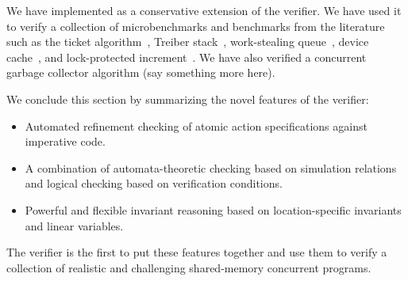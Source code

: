 We have implemented \civl as a conservative extension of the \boogie verifier.  
We have used it to verify a collection of microbenchmarks and benchmarks from the literature such as
the ticket algorithm~\cite{ticket}, Treiber stack~\cite{treiber}, work-stealing queue~\cite{wsq},
device cache~\cite{device-cache}, and lock-protected increment~\cite{incr}.
We have also verified a concurrent garbage collector algorithm (say something more here).

We conclude this section by summarizing the novel features of the \civl verifier:
\begin{itemize}
\item Automated refinement checking of atomic action specifications against imperative code.
\item A combination of automata-theoretic checking based on simulation relations and logical checking based on verification conditions.
\item Powerful and flexible invariant reasoning based on location-specific invariants and linear variables.
\end{itemize}
The \civl verifier is the first to put these features together and use them to verify a collection of realistic and challenging shared-memory
concurrent programs.

